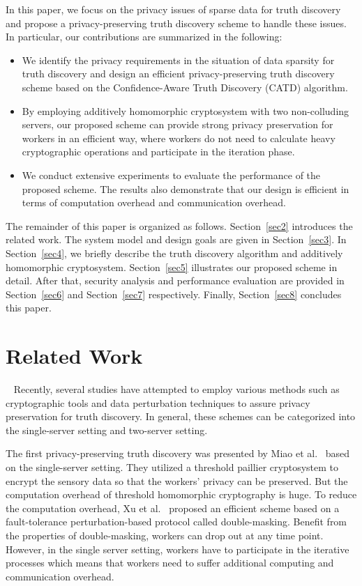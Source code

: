 \documentclass[conference]{IEEEtran}
\begin{document}
In this paper, we focus on the privacy issues of sparse data for truth discovery and propose a privacy-preserving truth discovery scheme to handle these issues.
In particular, our contributions are summarized in the following:
\begin{itemize}
  \item We identify the privacy requirements in the situation of data sparsity for truth discovery and design an efficient privacy-preserving truth discovery scheme based on the Confidence-Aware Truth Discovery (CATD) algorithm.
  \item By employing additively homomorphic cryptosystem with two non-colluding
servers, our proposed scheme can provide strong privacy preservation for workers in an efficient way, where workers do not need to calculate heavy cryptographic operations and participate in the iteration phase.
  \item We conduct extensive experiments to evaluate the performance of the proposed scheme. The results also demonstrate that our design is efficient in terms of computation overhead and communication overhead.
\end{itemize}

The remainder of this paper is organized as follows.
Section~\ref{sec2} introduces the related work.
The system model and design goals are given in Section~\ref{sec3}.
In Section~\ref{sec4}, we briefly describe the truth discovery algorithm and additively homomorphic cryptosystem.
Section~\ref{sec5} illustrates our proposed scheme in detail.
After that, security analysis and performance evaluation are provided in Section~\ref{sec6} and Section~\ref{sec7} respectively.
Finally, Section~\ref{sec8} concludes this paper.

\section{Related Work}~\label{sec2}
Recently, several studies have attempted to employ various methods such as cryptographic tools and data perturbation techniques to assure privacy preservation for truth discovery.
In general, these schemes can be categorized into the single-server setting and two-server setting.

The first privacy-preserving truth discovery was presented by Miao et al.~\cite{miao_cloud-enabled_2015} based on the single-server setting.
They utilized a threshold paillier cryptosystem to encrypt the sensory data so that the workers' privacy can be preserved.
But the computation overhead of threshold homomorphic cryptography is huge.
To reduce the computation overhead, Xu et al.~\cite{xu_efficient_2019} proposed an efficient scheme based on a fault-tolerance perturbation-based protocol called double-masking.
Benefit from the properties of double-masking, workers can drop out at any time point.
However, in the single server setting, workers have to participate in the iterative processes which means that workers need to suffer additional computing and communication overhead.
\end{document}
